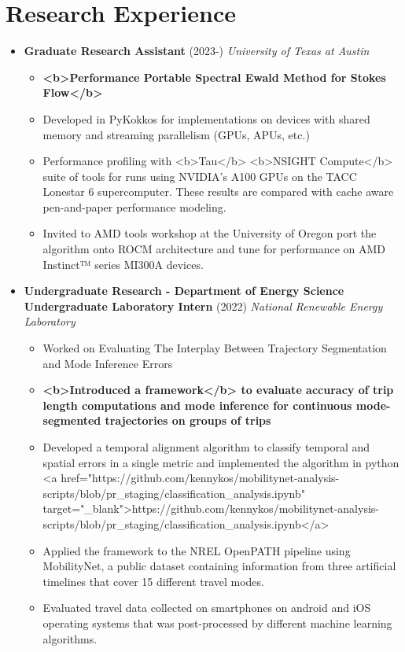 \section*{Research Experience}
\begin{itemize}
  \item \textbf{Graduate Research Assistant} (2023-)
    \textit{University of Texas at Austin}
    \begin{itemize}
      \item \textbf{<b>Performance Portable Spectral Ewald Method for Stokes Flow</b>}
        \item Developed in PyKokkos for implementations on devices with shared memory and streaming parallelism (GPUs, APUs, etc.)
        \item Performance profiling with <b>Tau</b> <b>NSIGHT Compute</b> suite of tools for runs using NVIDIA’s A100 GPUs on the TACC Lonestar 6 supercomputer. These results are compared with cache aware pen-and-paper performance modeling.
        \item Invited to AMD tools workshop at the University of Oregon port the algorithm onto ROCM architecture and tune for performance on AMD Instinct™ series MI300A devices.
    \end{itemize}
  \item \textbf{Undergraduate Research - Department of Energy Science Undergraduate Laboratory Intern} (2022)
    \textit{National Renewable Energy Laboratory}
    \begin{itemize}
      \item Worked on Evaluating The Interplay Between Trajectory Segmentation and Mode Inference Errors
      \item \textbf{<b>Introduced a framework</b> to evaluate accuracy of trip length computations and mode inference for continuous mode-segmented trajectories on groups of trips}
        \item Developed a temporal alignment algorithm to classify temporal and spatial errors in a single metric and implemented the algorithm in python <a href="https://github.com/kennykos/mobilitynet-analysis-scripts/blob/pr_staging/classification_analysis.ipynb" target="_blank">https://github.com/kennykos/mobilitynet-analysis-scripts/blob/pr_staging/classification_analysis.ipynb</a>
        \item Applied the framework to the NREL OpenPATH pipeline using MobilityNet, a public dataset containing information from three artificial timelines that cover 15 different travel modes.
        \item Evaluated travel data collected on smartphones on android and iOS operating systems that was post-processed by different machine learning algorithms.

\end{itemize}
\end{itemize}
